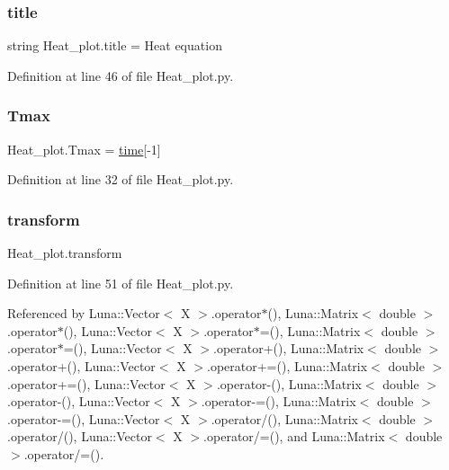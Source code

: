 \mbox{\label{namespaceHeat__plot_a018d451c743d64974f5a36b0e031e02e}} 
\subsubsection{\texorpdfstring{title}{title}}
{\footnotesize\ttfamily string Heat\+\_\+plot.\+title = \textquotesingle{}Heat equation\textquotesingle{}}



Definition at line 46 of file Heat\+\_\+plot.\+py.

\mbox{\label{namespaceHeat__plot_a4af99e02cb1eac65ec68fab8d5446c4a}} 
\subsubsection{\texorpdfstring{Tmax}{Tmax}}
{\footnotesize\ttfamily Heat\+\_\+plot.\+Tmax = \hyperlink{namespaceHeat__plot_a05e6ef830fa9da56c9ca594a34b644be}{time}\mbox{[}-\/1\mbox{]}}



Definition at line 32 of file Heat\+\_\+plot.\+py.

\mbox{\label{namespaceHeat__plot_aeaa6785bedcad63b4bd40e8cb1bad8a0}} 
\subsubsection{\texorpdfstring{transform}{transform}}
{\footnotesize\ttfamily Heat\+\_\+plot.\+transform}



Definition at line 51 of file Heat\+\_\+plot.\+py.



Referenced by Luna\+::\+Vector$<$ X $>$.\+operator$\ast$(), Luna\+::\+Matrix$<$ double $>$.\+operator$\ast$(), Luna\+::\+Vector$<$ X $>$.\+operator$\ast$=(), Luna\+::\+Matrix$<$ double $>$.\+operator$\ast$=(), Luna\+::\+Vector$<$ X $>$.\+operator+(), Luna\+::\+Matrix$<$ double $>$.\+operator+(), Luna\+::\+Vector$<$ X $>$.\+operator+=(), Luna\+::\+Matrix$<$ double $>$.\+operator+=(), Luna\+::\+Vector$<$ X $>$.\+operator-\/(), Luna\+::\+Matrix$<$ double $>$.\+operator-\/(), Luna\+::\+Vector$<$ X $>$.\+operator-\/=(), Luna\+::\+Matrix$<$ double $>$.\+operator-\/=(), Luna\+::\+Vector$<$ X $>$.\+operator/(), Luna\+::\+Matrix$<$ double $>$.\+operator/(), Luna\+::\+Vector$<$ X $>$.\+operator/=(), and Luna\+::\+Matrix$<$ double $>$.\+operator/=().

